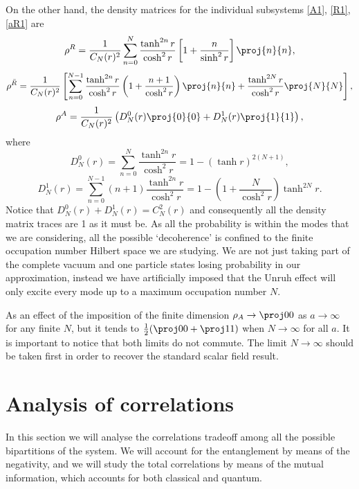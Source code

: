 On the other hand, the density matrices for the individual subsystems \eqref{A1}, \eqref{R1},\eqref{aR1} are
\begin{equation}\label{Robpartial}
\rho^{R}=\frac{1}{C_N(r)^2}\sum_{n=0}^N\frac{\tanh^{2n}r}{\cosh^2r}\left[1+\frac{n}{\sinh^2r}\right]\proj{n}{n},
\end{equation}
\begin{equation}\label{ARobpartial}
\rho^{\bar R}=\frac{1}{C_N(r)^2}\left[\sum_{n=0}^{N-1}\frac{\tanh^{2n}r}{\cosh^2r}\left(1+\frac{n+1}{\cosh^2r}\right)\proj{n}{n}+\frac{\tanh^{2N}r}{\cosh^2r}\proj{N}{N}\right],
\end{equation}
\begin{equation}\label{AlicedeAliceRob}
\rho^{A}=\frac{1}{C_N(r)^2}\left(D^0_N(r)\proj{0}{0}+D^1_N(r)\proj{1}{1}\right),
\end{equation}
where
\begin{equation}\label{S1}
D^0_N(r)=\sum_{n=0}^N\frac{\tanh^{2n}r}{\cosh^2 r}=1-(\tanh r)^{2(N+1)},
\end{equation}
\begin{equation}\label{S2}
D^1_N(r)\!=\!\! \sum_{n=0}^{N-1}(n+1)\frac{\tanh^{2n}r}{\cosh^2 r} =1-\left(1+\dfrac{N}{\cosh^2 r}\right) \tanh^{2 N}\!r.
\end{equation}
Notice that $D^0_N(r)+D^1_N(r)=C_N^2(r)$ and consequently all the density matrix traces are 1 as it must be. As all the probability is within the modes that we are considering, all the possible `decoherence' is confined to the finite occupation number Hilbert space we are studying. We are not just taking part of the complete vacuum and one particle states losing probability in our approximation, instead we have artificially imposed that the Unruh effect will only excite every mode up to a maximum occupation number $N$.

As an effect of the imposition of the finite dimension $\rho_A\rightarrow\proj00$ as $a\rightarrow\infty$ for any finite $N$, but it tends to $\frac12(\proj00+\proj11)$ when $N\rightarrow\infty$ for all $a$. It is important to notice that both limits do not commute. The limit $N\rightarrow\infty$ should be taken first in order to recover the standard scalar field result.

\section{Analysis of correlations}\label{sec4}

In this section we will analyse the correlations tradeoff among all the possible bipartitions of the system. We will account for the entanglement by means of the negativity, and we will study the total correlations by means of the mutual information, which accounts for both classical and quantum. 


